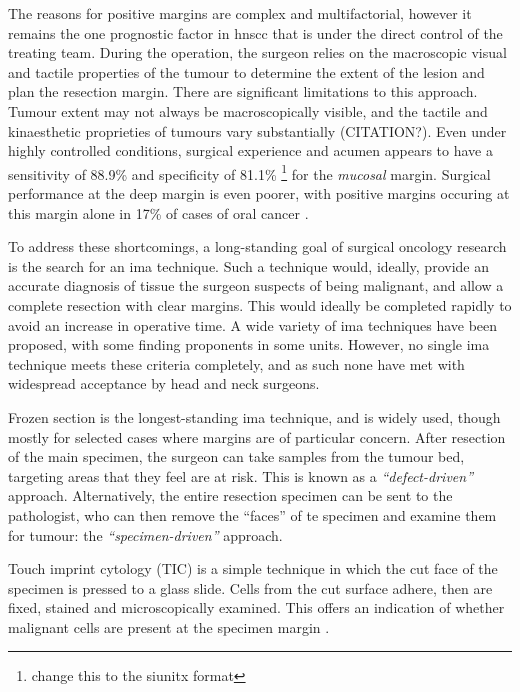 The reasons for positive margins are complex and multifactorial, however it remains the one prognostic factor in \gls{hnscc} that is under the direct control of the treating team.
During the operation, the surgeon relies on the macroscopic visual and tactile properties of the tumour to determine the extent of the lesion and plan the resection margin.
There are significant limitations to this approach. 
Tumour extent may not always be macroscopically visible, and the tactile and kinaesthetic proprieties of tumours vary substantially (CITATION?).
Even under highly controlled conditions, surgical experience and acumen appears to have a sensitivity of 88.9\% and specificity of 81.1\% \footnote{change this to the siunitx format} \cite{chaturvedip.GrossExaminationSurgeon2014} for the \emph{mucosal} margin.
Surgical performance at the deep margin is even poorer, with positive margins occuring at this margin alone in 17\% of cases of oral cancer \cite{woolgarHistopathologicalAppraisalSurgical2005}.

To address these shortcomings, a long-standing goal of surgical oncology research is the search for an \gls{ima}  technique.
Such a technique would, ideally, provide an accurate diagnosis of tissue the surgeon suspects of being malignant, and allow a complete resection with clear margins.
This would ideally be completed rapidly to avoid an increase in operative time.
A wide variety of \gls{ima} techniques have been proposed, with some finding proponents in some units.
However, no single \gls{ima} technique meets these criteria completely, and as such none have met with widespread acceptance by head and neck surgeons.

Frozen section is the longest-standing \gls{ima} technique, and is widely used, though mostly for selected cases where margins are of particular concern.
After resection of the main specimen, the surgeon can take samples from the tumour bed, targeting  areas that they feel are at risk.
This is known as a \emph{``defect-driven''} approach.
Alternatively, the entire resection specimen can be sent to the pathologist, who can then remove the ``faces'' of te specimen and examine them for tumour: the \emph{``specimen-driven''} approach.

Touch imprint cytology (TIC) is a simple technique in which the cut face of the specimen is pressed to a glass slide. 
Cells from the cut surface adhere, then are fixed, stained and microscopically examined. 
This offers an indication of whether malignant cells are present at the specimen margin \cite{naveedDiagnosticAccuracyTouch2017}.

